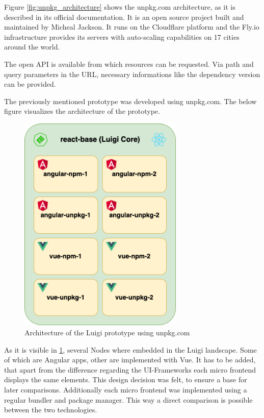 Figure \ref{fig:unpkg_architecture} shows the unpkg.com architecture, as it is described in its official documentation. It is an open source project built and maintained by Micheal Jackson. It runs on the Cloudflare platform and the Fly.io infrastructure provides its servers with auto-scaling capabilities on 17 cities around the world.\cite{unpkg_doc}

The open API is available from which resources can be requested. Via path and query parameters in the URL, necessary informations like the dependency version can be provided.

The previously mentioned prototype was developed using unpkg.com. The below figure visualizes the architecture of the prototype.

\begin{figure}[!h]
	\centering
	\includegraphics[width=0.7\textwidth]{Figures/unpkg.architecture.drawio.png}
	\caption{Architecture of the Luigi prototype using unpkg.com}
	\label{fig:unpkg_prototype_architecture}
\end{figure}

As it is visible in \ref{fig:unpkg_prototype_architecture}, several Nodes where embedded in the Luigi landscape. Some of which are Angular apps, other are implemented with Vue. It has to be added, that apart from the difference regarding the UI-Frameworks each micro frontend displays the same elements. This design decision was felt, to ensure a base for later comparisons. Additionally each micro frontend was implemented using a regular bundler and package manager. This way a direct comparison is possible between the two technologies.

